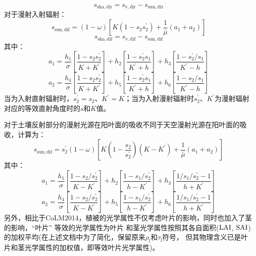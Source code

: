 \begin{equation}
  s_{\mathrm{sha,dir}}=s_{\mathrm{v,dir}}-s_{\mathrm{sun,dir}}
\end{equation}
对于漫射入射辐射：
\begin{equation}
  s_{\mathrm{sun,dif}}=(1-\omega)\left[K\left(1-s_{2} s_{2}^{\prime}\right)+\frac{1}{\bar{\mu}}\left(a_{1}+a_{2}\right)\right]
\end{equation}
\begin{equation}
  s_{\mathrm{sha,dif}}=s_{\mathrm{v,dif}}-s_{\mathrm{sun,dif}}
\end{equation}
其中：
\begin{equation}
  a_{1}=\frac{h_{1}}{\sigma}\left[\frac{1-s_{2} s_{2}^{\prime}}{K+K^{\prime}}\right]+h_{2}\left[\frac{1-s_{2}^{\prime}
  s_{1}}{K^{\prime}+h}\right]+h_{3}\left[\frac{1-s_{2}^{\prime} / s_{1}}{K^{\prime}-h}\right]
\end{equation}
\begin{equation}
  a_{2}=\frac{h_{4}}{\sigma}\left[\frac{1-s_{2} s_{2}^{\prime}}{K+K^{\prime}}\right]+h_{5}\left[\frac{1-s_{2}^{\prime} s_{1}}
  {K^{\prime}+h}\right]+h_{6}\left[\frac{1-s_{2} / s_{1}}{K^{\prime}-h}\right]
\end{equation}
当为入射直射辐射时，$s_2^\prime=s_2$、$K^\prime=K$；当为入射漫射辐射时$s_2^\prime$、$K^\prime$为漫射辐射对应的等效直射角度时的$s$和$K$值。


对于土壤反射部分的漫射光源在阳叶面的吸收不同于天空漫射光源在阳叶面的吸收，计算为：
\begin{equation}
  s_{\mathrm{s u n, dif}}=s_{2}^{\prime}(1-\omega)\left[K\left(1-\frac{s_{2}}{s_{2}^{\prime}}\right)
  \left(K-K^{\prime}\right)+\frac{1}{\bar{\mu}}\left(a_{1}+a_{2}\right)\right]
\end{equation}
其中：
\begin{equation}
  a_{1}=\frac{h_{1}}{\sigma}\left[\frac{1-s_{2} / s_{2}^{\prime}}{K-K^{\prime}}\right]+h_{2}\left[\frac{1-s_{1} /
  s_{2}^{\prime}}{h-K^{\prime}}\right]+h_{3}\left[\frac{1 / s_{1} / s_{2}^{\prime}-1}{h+K^{\prime}}\right]
\end{equation}
\begin{equation}
  a_{2}=\frac{h_{4}}{\sigma}\left[\frac{1-s_{2} / s_{2}^{\prime}}{K-K^{\prime}}\right]+h_{5}\left[\frac{1-s_{1} /
  s_{2}^{\prime}}{h-K^{\prime}}\right]+h_{6}\left[\frac{1 / s_{1} / s_{2}^{\prime}-1}{h+K^{\prime}}\right]
\end{equation}
另外，相比于CoLM2014，植被的光学属性不仅考虑叶片的影响，同时也加入了茎的影响，``叶片'' 等效的光学属性为叶片
和茎光学属性按照其各自面积($\rm LAI$, $\rm SAI$)的加权平均(在上述文档中为了简化，保留原来$\rho_{\mathrm {l}}$和$\tau_{\mathrm {l}}$符号，
但其物理含义已是叶片和茎光学属性的加权值，即等效叶片光学属性)。


